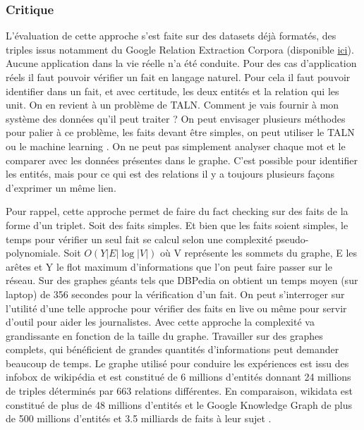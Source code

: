 \subsubsection{Critique}

L'évaluation de cette approche s'est faite sur des datasets déjà formatés, des triples issus notamment du Google Relation Extraction Corpora
(disponible \href{https://github.com/google-research-datasets/relation-extraction-corpus}{ici}). Aucune application dans la vie réelle n'a été conduite. Pour des cas d'application réels il faut pouvoir vérifier un fait en langage naturel. Pour cela il faut pouvoir identifier dans un fait, et avec certitude, les deux entités et la relation qui les unit. On en revient à un problème de TALN. Comment je vais fournir à mon système des données qu'il peut traiter ? On peut envisager plusieurs méthodes pour palier à ce problème, les faits devant être simples, on peut utiliser le TALN ou le machine learning \cite{googleai}. On ne peut pas simplement analyser chaque mot et le comparer avec les données présentes dans le graphe. C'est possible pour identifier les entités, mais pour ce qui est des relations il y a toujours plusieurs façons d'exprimer un même lien.

Pour rappel, cette approche permet de faire du fact checking sur des faits de la forme d'un triplet. Soit des faits simples. Et bien que les faits soient simples, le temps pour vérifier un seul fait se calcul selon une complexité pseudo-polynomiale. Soit $ O(Y|E|\log |V|)$ où V représente les sommets du graphe, E les arêtes et Y le flot maximum d'informations que l'on peut faire passer sur le réseau. Sur des graphes géants tels que DBPedia on obtient un temps moyen (sur laptop) de 356 secondes pour la vérification d'un fait. On peut s'interroger sur l'utilité d'une telle approche pour vérifier des faits en live ou même pour servir d'outil pour aider les journalistes. Avec cette approche la complexité va grandissante en fonction de la taille du graphe. Travailler sur des graphes complets, qui bénéficient de grandes quantités d'informations peut demander beaucoup de temps. Le graphe utilisé pour conduire les expériences est issu des infobox de wikipédia et est constitué de 6 millions d'entités donnant 24 millions de triples déterminés par 663 relations différentes. En comparaison, wikidata est constitué de plus de 48 millions d'entités \cite{wikidata:statistics} \cite{wikidata:statistics2} et le Google Knowledge Graph de plus de 500 millions d'entités et 3.5 milliards de faits à leur sujet \cite{google:kg}.

